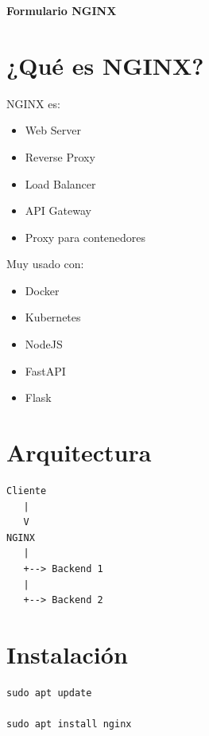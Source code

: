 \documentclass[a4paper,11pt]{article}
\begin{document}
\begin{center}
    {\Large \textbf{Formulario NGINX}}\\
\end{center}


\section*{¿Qué es NGINX?}

NGINX es:
\begin{itemize}
    \item Web Server
    \item Reverse Proxy
    \item Load Balancer
    \item API Gateway
    \item Proxy para contenedores
\end{itemize}

Muy usado con:
\begin{itemize}
    \item Docker
    \item Kubernetes
    \item NodeJS
    \item FastAPI
    \item Flask
\end{itemize}


\section*{Arquitectura}

\begin{center}
\begin{lstlisting}
Cliente
   |
   V
NGINX
   |
   +--> Backend 1
   |
   +--> Backend 2
\end{lstlisting}
\end{center}


\section*{Instalación}

\begin{lstlisting}
sudo apt update

sudo apt install nginx
\end{lstlisting}
\end{document}
